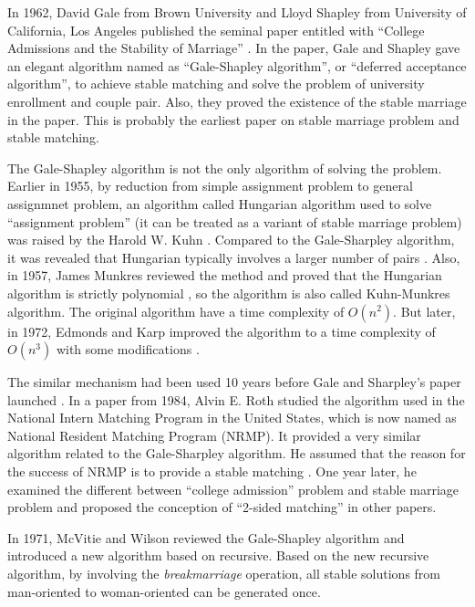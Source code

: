 \documentclass[14pt]{extarticle}
\begin{document}
In 1962, David Gale from Brown University and Lloyd Shapley from University of California, Los Angeles published the seminal paper entitled with “College Admissions and the Stability of Marriage” \cite{GS1962}. 
In the paper, Gale and Shapley gave an elegant algorithm named as “Gale-Shapley algorithm”, or “deferred acceptance algorithm”, to achieve stable matching and solve the problem of university enrollment and couple pair. 
Also, they proved the existence of the stable marriage in the paper. 
This is probably the earliest paper on stable marriage problem and stable matching. 

The Gale-Shapley algorithm is not the only algorithm of solving the problem. 
Earlier in 1955, by reduction from simple assignment problem to general assignmnet problem, an algorithm called Hungarian algorithm used to solve “assignment problem” (it can be treated as a variant of stable marriage problem) was raised by the Harold W. Kuhn \cite{Kuhn1955}. 
Compared to the Gale-Sharpley algorithm, it was revealed that Hungarian typically involves a larger number of pairs \cite{manlove2013}.
Also, in 1957, James Munkres reviewed the method and proved that the Hungarian algorithm is strictly polynomial \cite{Munkres1957}, so the algorithm is also called Kuhn-Munkres algorithm.
The original algorithm have a time complexity of $O(n^2)$. 
But later, in 1972, Edmonds and Karp improved the algorithm to a time complexity of $O(n^3)$ with some modifications \cite{Edmonds_Karp1972}.

The similar mechanism had been used 10 years before Gale and Sharpley’s paper launched \cite{GS1962}.
In a paper from 1984, Alvin E. Roth studied the algorithm used in the National Intern Matching Program in the United States, which is now named as National Resident Matching Program (NRMP). 
It provided a very similar algorithm related to the Gale-Sharpley algorithm. 
He assumed that the reason for the success of NRMP is to provide a stable matching \cite{Roth1984NRMP}. 
One year later, he examined the different between “college admission” problem and stable marriage problem \cite{Roth1985NotEqual} and proposed the conception of “2-sided matching” \cite{Roth1985bipartite} in other papers. 

In 1971, McVitie and Wilson \cite{McVitie&Wilson} reviewed the Gale-Shapley algorithm and introduced a new algorithm based on recursive. 
Based on the new recursive algorithm, by involving the {\it breakmarriage} operation, all stable solutions from man-oriented to woman-oriented can be generated once.
\end{document}
